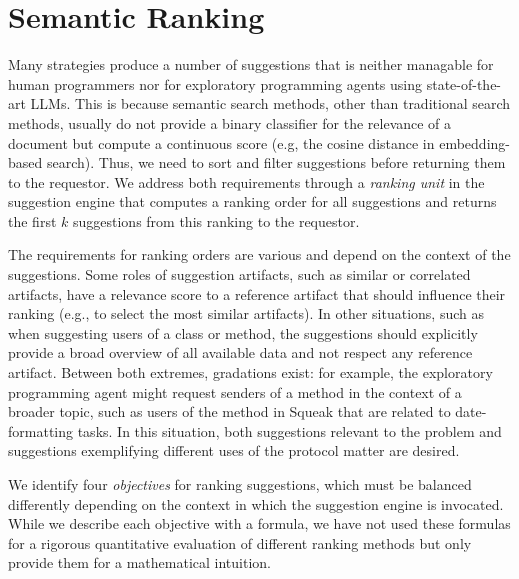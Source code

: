 
\section{Semantic Ranking}
\label{sec:suggestions/ranking}

Many strategies produce a number of suggestions that is neither managable for human programmers nor for exploratory programming agents using state-of-the-art LLMs.
This is because semantic search methods, other than traditional search methods, usually do not provide a binary classifier for the relevance of a document but compute a continuous score (e.g, the cosine distance in embedding-based search).
Thus, we need to sort and filter suggestions before returning them to the requestor.
We address both requirements through a \emph{ranking unit} in the suggestion engine that computes a ranking order for all suggestions and returns the first $k$ suggestions from this ranking to the requestor.

The requirements for ranking orders are various and depend on the context of the suggestions.
Some roles of suggestion artifacts, such as similar or correlated artifacts, have a relevance score to a reference artifact that should influence their ranking (e.g., to select the most similar artifacts).
In other situations, such as when suggesting users of a class or method, the suggestions should explicitly provide a broad overview of all available data and not respect any reference artifact.
Between both extremes, gradations exist: for example, the exploratory programming agent might request senders of a method in the context of a broader topic, such as users of the  method in Squeak that are related to date-formatting tasks.
In this situation, both suggestions relevant to the problem and suggestions exemplifying different uses of the protocol matter are desired.

We identify four \emph{objectives} for ranking suggestions, which must be balanced differently depending on the context in which the suggestion engine is invocated.
While we describe each objective with a formula, we have not used these formulas for a rigorous quantitative evaluation of different ranking methods but only provide them for a mathematical intuition.

